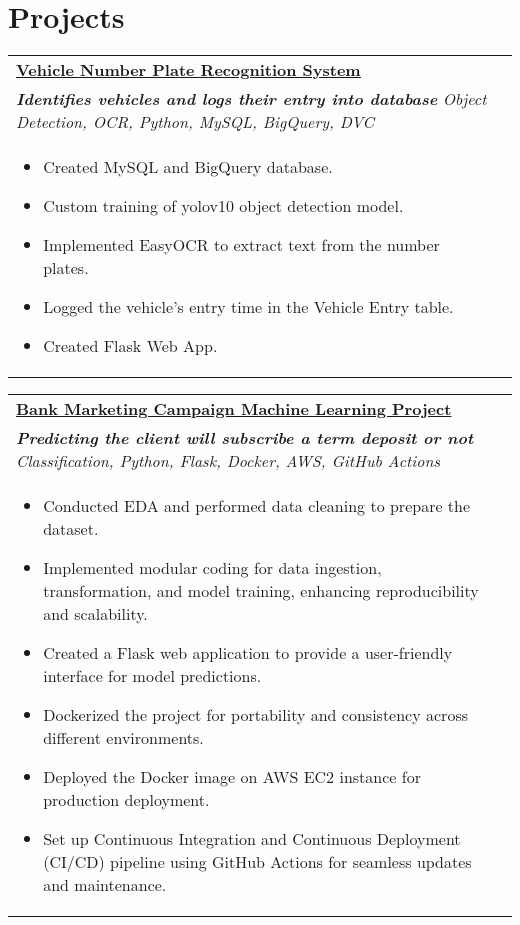 \documentclass[a4paper,8pt]{article}
\begin{document}
\section{Projects}
\begin{tabularx}{\linewidth}{ @{}l r@{} }
\color[HTML]{1C033C} \textbf{\uline{\href{https://github.com/vikaschauhan734/vehicle_number_plate_detection}{Vehicle Number Plate Recognition System}}}\\[4pt]
\color[HTML]{371e77}\textbf{\textit{Identifies vehicles and logs their entry into database}} \hfill \color[HTML]{4B28A4} \textit{Object Detection, OCR, Python, MySQL, BigQuery, DVC} \\[5pt]
\begin{minipage}[t]{\linewidth}
    \begin{itemize}[nosep,after=\strut, leftmargin=2em, itemsep=2pt]
        	\item Created MySQL and BigQuery database.
	\item Custom training of yolov10 object detection model.
	\item Implemented EasyOCR to extract text from the number plates.
	\item Logged the vehicle's entry time in the Vehicle Entry table.
	\item Created Flask Web App.
    \end{itemize}
    \end{minipage}
\end{tabularx}

\begin{tabularx}{\linewidth}{ @{}l r@{} }
\color[HTML]{1C033C} \textbf{\uline{\href{https://github.com/vikaschauhan734/bank_marketing_campaign}{Bank Marketing Campaign Machine Learning Project}}}\\[4pt]
\color[HTML]{371e77}\textbf{\textit{Predicting the client will subscribe a term deposit or not}} \hfill \color[HTML]{4B28A4} \textit{Classification, Python, Flask, Docker, AWS, GitHub Actions} \\[5pt]
\begin{minipage}[t]{\linewidth}
    \begin{itemize}[nosep,after=\strut, leftmargin=2em, itemsep=2pt]
       	 \item Conducted EDA and performed data cleaning to prepare the dataset.
	\item Implemented modular coding for data ingestion, transformation, and model training, enhancing reproducibility and scalability.
	\item Created a Flask web application to provide a user-friendly interface for model predictions.
	\item Dockerized the project for portability and consistency across different environments.
	\item Deployed the Docker image on AWS EC2 instance for production deployment.
	\item Set up Continuous Integration and Continuous Deployment (CI/CD) pipeline using GitHub Actions for seamless updates and maintenance.
    \end{itemize}
    \end{minipage}
\end{tabularx}
\end{document}
